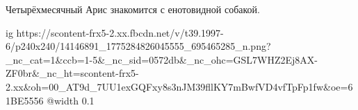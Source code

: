  
 
 
 
 

Четырёхмесячный Арис знакомится с енотовидной собакой.


\ifcmt
  ig https://scontent-frx5-2.xx.fbcdn.net/v/t39.1997-6/p240x240/14146891_1775284826045555_695465285_n.png?_nc_cat=1&ccb=1-5&_nc_sid=0572db&_nc_ohc=GSL7WHZ2Ej8AX-ZF0br&_nc_ht=scontent-frx5-2.xx&oh=00_AT9d_7UU1exGQFxy8s3nJM39fllKY7mBwfVD4vfTpFp1fw&oe=61BE5556
  @width 0.1
\fi
